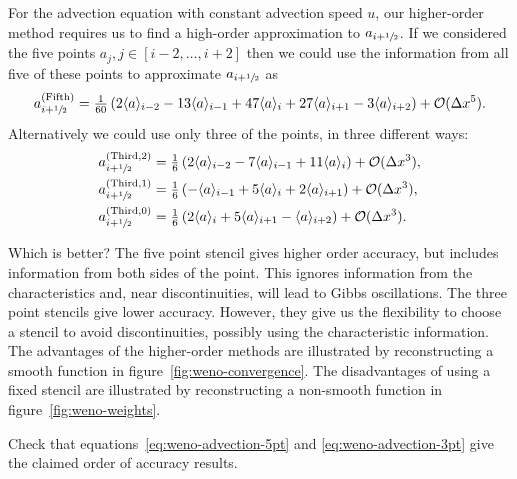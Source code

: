 For the advection equation with constant advection speed $u$, our higher-order
method requires us to find a high-order approximation to $a_{i+{\sfrac{1}{2}}}$. If we
considered the five points $a_{j}, j \in [i-2, \dots, i+2]$ then we could use
the information from all five of these points to approximate $a_{i+{\sfrac{1}{2}}}$ as
\begin{equation}
  \label{eq:weno-advection-5pt}
  a^{(\text{Fifth})}_{i+{\sfrac{1}{2}}} = \tfrac{1}{60} \left( 2 \langle a \rangle_{i-2} - 13 \langle a \rangle_{i-1} + 47 \langle a \rangle_{i} + 27 \langle a \rangle_{i+1} - 3 \langle a \rangle_{i+2} \right) + {\cal O}(\Delta x^5).
\end{equation}
Alternatively we could use only three of the points, in three different ways:
\begin{subequations}
  \label{eq:weno-advection-3pt}
  \begin{align}
    a^{(\text{Third}, 2)}_{i+{\sfrac{1}{2}}} &= \tfrac{1}{6} \left( 2 \langle a \rangle_{i-2} - 7 \langle a \rangle_{i-1} + 11 \langle a \rangle_{i} \right) + {\cal O}(\Delta x^3), \\
    a^{(\text{Third}, 1)}_{i+{\sfrac{1}{2}}} &= \tfrac{1}{6} \left( - \langle a \rangle_{i-1} + 5 \langle a \rangle_{i} + 2 \langle a \rangle_{i+1} \right) + {\cal O}(\Delta x^3), \\
    a^{(\text{Third}, 0)}_{i+{\sfrac{1}{2}}} &= \tfrac{1}{6} \left( 2 \langle a \rangle_{i} + 5 \langle a \rangle_{i+1} - \langle a \rangle_{i+2} \right) + {\cal O}(\Delta x^3).
  \end{align}
\end{subequations}

Which is better? The five point stencil gives higher order accuracy, but
includes information from both sides of the point. This ignores information from
the characteristics and, near discontinuities, will lead to Gibbs oscillations.
The three point stencils give lower accuracy. However, they give us the
flexibility to choose a stencil to avoid discontinuities, possibly using the
characteristic information. The advantages of the higher-order methods are illustrated by reconstructing a smooth function in figure~\ref{fig:weno-convergence}. The disadvantages of using a fixed stencil are illustrated by reconstructing a non-smooth function in figure~\ref{fig:weno-weights}.


\begin{exercise}
{Check that equations~\eqref{eq:weno-advection-5pt} and
\eqref{eq:weno-advection-3pt} give the claimed order of accuracy results.}
\end{exercise}

